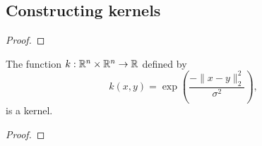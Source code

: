 \subsection{Constructing kernels}
\label{sub:constructing-kernels}

\begin{theorem}
    \label{thm:constructing-kernels}
    \cite{rudin2020notes,shawe2004kernel}
    
\end{theorem}
\begin{proof}
    
\end{proof}

\begin{theorem}
    \label{thm:gaussian-kernel}
    The function \(k : \mathbb{R}^n \times \mathbb{R}^n \to \mathbb{R}\) defined by
    \begin{equation}
        \label{eqn:gaussian-kernel}
        k(x,y) = \exp\left(\frac{-\|x-y\|^2_2}{\sigma^2}\right),
    \end{equation}
    is a kernel.
\end{theorem}

\begin{proof}
    
\end{proof}